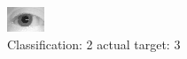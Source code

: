 \begin{figure}[h!]
\begin{center}
\includegraphics[width=0.60\columnwidth]{figures/ID1186_class_2_target_3.png}
\end{center}
\caption{ Classification: 2 actual target: 3}
\label{fig:ID1186_class_2_target_3}
\end{figure}
